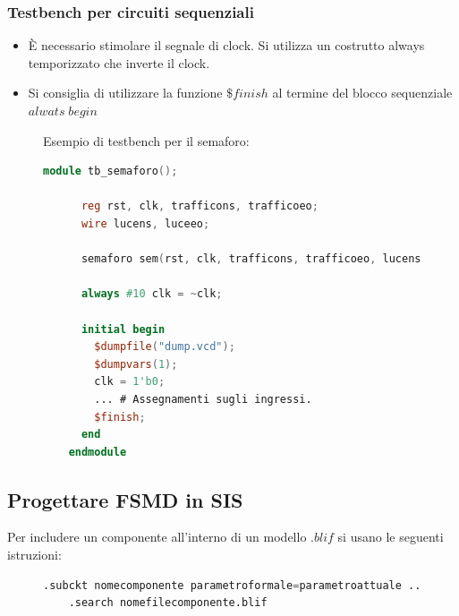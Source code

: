 \documentclass[a4paper]{article}
\theoremstyle{break}
\theoremstyle{break}
\theoremstyle{break}
\theoremstyle{break}
\begin{document}
\subsubsection{Testbench per circuiti sequenziali}
\begin{itemize}
  \item È necessario stimolare il segnale di clock. Si utilizza un costrutto always temporizzato
    che inverte il clock.
  \item Si consiglia di utilizzare la funzione \( \$finish \) al termine del blocco sequenziale
    \( alwats\;begin\) 
\end{itemize}
\begin{figure}[H]
  \begin{example}
    Esempio di testbench per il semaforo:
    \begin{lstlisting}[language=Verilog]
    module tb_semaforo();

      reg rst, clk, trafficons, trafficoeo;
      wire lucens, luceeo;

      semaforo sem(rst, clk, trafficons, trafficoeo, lucens, luceeo);

      always #10 clk = ~clk;

      initial begin
        $dumpfile("dump.vcd");
        $dumpvars(1);
        clk = 1'b0;
        ... # Assegnamenti sugli ingressi.
        $finish;
      end
    endmodule
    \end{lstlisting}
  \end{example}
\end{figure}

\subsection{Progettare FSMD in SIS}
Per includere un componente all'interno di un modello \( .blif \) si usano le seguenti istruzioni:
\begin{figure}[H]
  \begin{lstlisting}[language=Verilog]
    .subckt nomecomponente parametroformale=parametroattuale ...
    .search nomefilecomponente.blif
  \end{lstlisting}
\end{figure}
\end{document}
